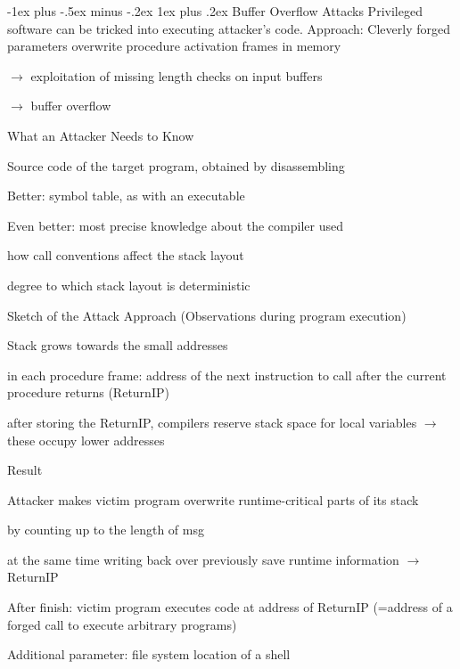 \documentclass[a4paper]{article}
\makeatletter
\renewcommand{\subsubsection}{\@startsection{subsubsection}{3}{0mm}%
                {-1ex plus -.5ex minus -.2ex}%
                {1ex plus .2ex}%
                {\normalfont\small\bfseries}}
\makeatother
\begin{document}
\begin{multicols}{3}
    \subsubsection{Buffer Overflow Attacks}
    Privileged software can be tricked into executing attacker’s code.
    Approach: Cleverly forged parameters overwrite procedure activation frames in memory
    \begin{itemize*}
        \item[$\rightarrow$] exploitation of missing length checks on input buffers
        \item[$\rightarrow$] buffer overflow
    \end{itemize*}
    What an Attacker Needs to Know
    \begin{itemize*}
        \item Source code of the target program, obtained by disassembling
        \item Better: symbol table, as with an executable
        \item Even better: most precise knowledge about the compiler used
        \begin{itemize*}
            \item how call conventions affect the stack layout
            \item degree to which stack layout is deterministic
        \end{itemize*}
    \end{itemize*}
    Sketch of the Attack Approach (Observations during program execution)
    \begin{itemize*}
        \item Stack grows towards the small addresses
        \item in each procedure frame: address of the next instruction to call after the current procedure returns (ReturnIP)
        \item after storing the ReturnIP, compilers reserve stack space for local variables $\rightarrow$ these occupy lower addresses
    \end{itemize*}
    Result
    \begin{itemize*}
        \item Attacker makes victim program overwrite runtime-critical parts of its stack
        \begin{itemize*}
            \item by counting up to the length of msg
            \item at the same time writing back over previously save runtime information $\rightarrow$ ReturnIP
        \end{itemize*}
        \item After finish: victim program executes code at address of ReturnIP (=address of a forged call to execute arbitrary programs)
        \item Additional parameter: file system location of a shell
    \end{itemize*}


\end{multicols}
\end{document}

